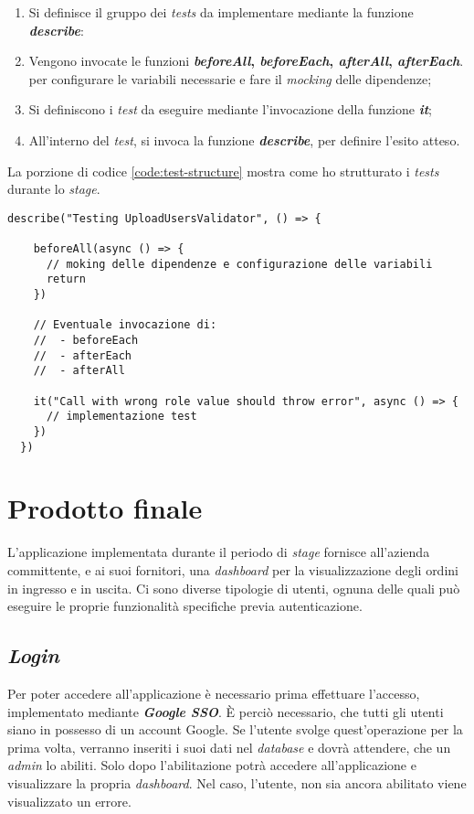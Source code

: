 \begin{enumerate}
  \item Si definisce il gruppo dei \emph{tests} da implementare mediante la funzione \textbf{\emph{describe}}:
  \item Vengono invocate le funzioni \textbf{\emph{beforeAll}, \emph{beforeEach}, \emph{afterAll}, \emph{afterEach}}. per configurare le variabili necessarie e fare il \emph{mocking} delle dipendenze;
  \item Si definiscono i \emph{test} da eseguire mediante l'invocazione della funzione \emph{\textbf{it}};
  \item All'interno del \emph{test}, si invoca la funzione \emph{\textbf{describe}}, per definire l'esito atteso.
\end{enumerate}

La porzione di codice \ref{code:test-structure} mostra come ho strutturato i \emph{tests} durante lo \emph{stage}.

\begin{lstlisting}[caption=Esempio di struttura di \emph{test}, label={code:test-structure}, captionpos=b]
  describe("Testing UploadUsersValidator", () => {

    beforeAll(async () => {
      // moking delle dipendenze e configurazione delle variabili
      return 
    })

    // Eventuale invocazione di:
    //  - beforeEach
    //  - afterEach
    //  - afterAll

    it("Call with wrong role value should throw error", async () => {
      // implementazione test
    })
  })
\end{lstlisting}

\section{Prodotto finale}
L'applicazione implementata durante il periodo di \emph{stage} fornisce all'azienda committente, e ai suoi fornitori, una \emph{dashboard} per la visualizzazione degli ordini in ingresso e in uscita.
Ci sono diverse tipologie di utenti, ognuna delle quali può eseguire le proprie funzionalità specifiche previa autenticazione. 

\subsection{\emph{Login}}
Per poter accedere all'applicazione è necessario prima effettuare l'accesso, implementato mediante \emph{\textbf{Google SSO}}. 
È perciò necessario, che tutti gli utenti siano in possesso di un account Google.
Se l'utente svolge quest'operazione per la prima volta, verranno inseriti i suoi dati nel \emph{database} e dovrà attendere, che un \emph{admin} lo abiliti.
Solo dopo l'abilitazione potrà accedere all'applicazione e visualizzare la propria \emph{dashboard}. 
Nel caso, l'utente, non sia ancora abilitato viene visualizzato un errore.

